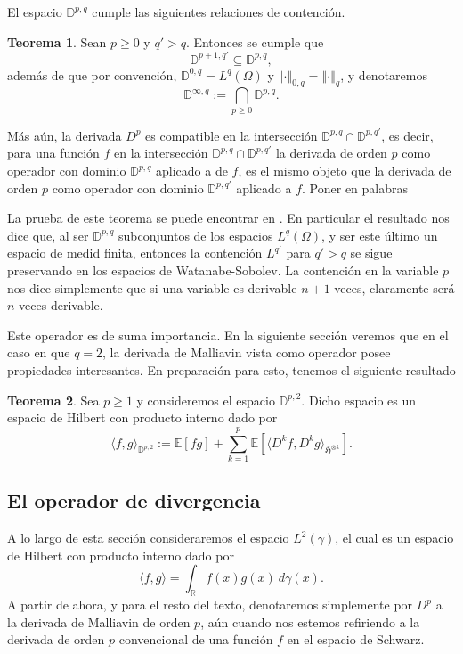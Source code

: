 \documentclass[letterpaper,twoside,12pt]{book}
\newcommand{\R}{\mathbb{R}}
\newcommand{\D}{\mathbb{D}}
\newcommand{\E}{\mathbb{E}}
\newcommand{\1}{\mathds{1}}
\newcommand{\norm}[1]{\left\Vert #1 \right\Vert}
\theoremstyle{definition}
\theoremstyle{definition}
\newtheorem{teo}{Teorema}
\theoremstyle{remark}
\theoremstyle{definition}
\theoremstyle{definition}
\theoremstyle{definition}
\theoremstyle{definition}
\theoremstyle{definition}
\begin{document}
El espacio $\D^{p,q}$ cumple las siguientes relaciones de contención.

\begin{teo}\label{teocontencionessobolev}
Sean $p\geq0$ y $q'>q$. Entonces se cumple que 
\[
\D^{p+1,q'}\subseteq \D^{p,q},
\]
además de que por convención, $\D^{0,q}=L^{q}(\Omega)$ y $\norm{\cdot}_{0,q}=\norm{\cdot}_{q}$, y denotaremos 
\[
\D^{\infty,q}:=\bigcap_{p\geq0} \D^{p,q}.
\]

Más aún, la derivada $D^{p}$ es compatible en la intersección $\D^{p,q}\cap \D^{p,q'}$, es decir, para una función $f$ en la intersección $\D^{p,q}\cap \D^{p,q'}$ la derivada de orden $p$ como operador con dominio $\D^{p,q}$ aplicado a de $f$, es el mismo objeto que la derivada de orden $p$ como operador con dominio $\D^{p,q'}$ aplicado a $f$. {\color{blue}Poner en palabras}
\end{teo}
La prueba de este teorema se puede encontrar en \cite[p. 27]{nualart2006malliavin}. En particular el resultado nos dice que, al ser $\D^{p,q}$ subconjuntos de los espacios $L^{q}(\Omega)$, y ser este último un espacio de medid finita, entonces la contención $L^{q'}$ para $q'>q$ se sigue preservando en los espacios de Watanabe-Sobolev. La contención en la variable $p$ nos dice simplemente que si una variable es derivable $n+1$ veces, claramente será $n$ veces derivable.

Este operador es de suma importancia. En la siguiente sección veremos que en el caso en que $q=2$, la derivada de Malliavin vista como operador posee propiedades interesantes. En preparación para esto, tenemos el siguiente resultado
\begin{teo} 
 Sea $p\geq1$ y consideremos el espacio $\D^{p,2}$. Dicho espacio es un espacio de Hilbert con producto interno dado por 
 \[
 \langle f,g\rangle_{\D^{p,2}}:=\E\left[fg\right]+\sum_{k=1}^{p}\E\left[\langle D^{k}f,D^{k}g\rangle_{\mathfrak{H}^{\otimes k}}\right].
 \]
 \end{teo}

\subsection{El operador de divergencia}

A lo largo de esta sección consideraremos el espacio $L^2(\gamma)$, el cual es un espacio de Hilbert con producto interno dado por 
\[
\langle f,g\rangle=\int_\R f(x)g(x)\ d\gamma(x).
\]
A partir de ahora, y para el resto del texto, denotaremos simplemente por $D^{p}$ a la derivada de Malliavin de orden $p$, aún cuando nos estemos refiriendo a la derivada de orden $p$ convencional de una función $f$ en el espacio de Schwarz.
\end{document}
